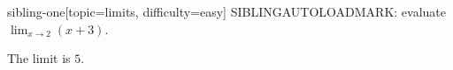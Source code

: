 %
\begin{problem}{sibling-one}[topic=limits, difficulty=easy]
	SIBLINGAUTOLOADMARK: evaluate $\lim_{x \to 2} (x + 3)$.
	\begin{solution} The limit is $5$. \end{solution}
\end{problem}
